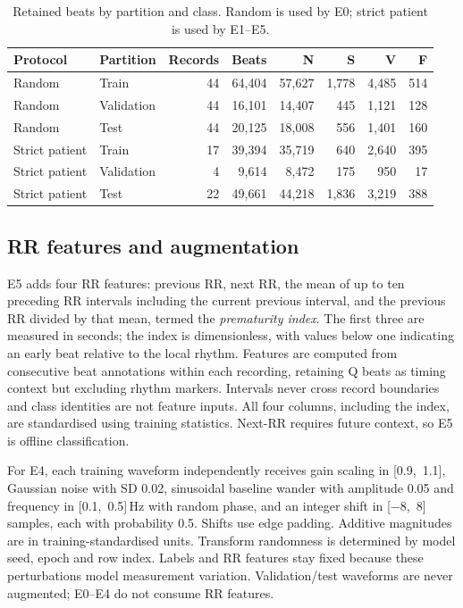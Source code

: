 \documentclass[10pt,a4paper]{article}
\begin{document}
\begin{table}[!htb]
\centering\small
\caption{Retained beats by partition and class. Random is used by E0; strict patient is used by E1--E5.}\label{tab:1}
\begin{tabular}{llrrrrrr}
\toprule
\textbf{Protocol} & \textbf{Partition} & \textbf{Records} & \textbf{Beats} & \textbf{N} & \textbf{S} & \textbf{V} & \textbf{F} \\
\midrule
Random & Train & 44 & 64,404 & 57,627 & 1,778 & 4,485 & 514 \\
Random & Validation & 44 & 16,101 & 14,407 & 445 & 1,121 & 128 \\
Random & Test & 44 & 20,125 & 18,008 & 556 & 1,401 & 160 \\
\midrule
Strict patient & Train & 17 & 39,394 & 35,719 & 640 & 2,640 & 395 \\
Strict patient & Validation & 4 & 9,614 & 8,472 & 175 & 950 & 17 \\
Strict patient & Test & 22 & 49,661 & 44,218 & 1,836 & 3,219 & 388 \\
\bottomrule
\end{tabular}
\end{table}

\subsection{RR features and augmentation}

E5 adds four RR features: previous RR, next RR, the mean of up to ten preceding RR intervals including the current previous interval, and the previous RR divided by that mean, termed the \emph{prematurity index}. The first three are measured in seconds; the index is dimensionless, with values below one indicating an early beat relative to the local rhythm. Features are computed from consecutive beat annotations within each recording, retaining Q beats as timing context but excluding rhythm markers. Intervals never cross record boundaries and class identities are not feature inputs. All four columns, including the index, are standardised using training statistics. Next-RR requires future context, so E5 is offline classification.

For E4, each training waveform independently receives gain scaling in [0.9,~1.1], Gaussian noise with SD 0.02, sinusoidal baseline wander with amplitude 0.05 and frequency in [0.1,~0.5]\,Hz with random phase, and an integer shift in [−8,~8] samples, each with probability 0.5. Shifts use edge padding. Additive magnitudes are in training-standardised units. Transform randomness is determined by model seed, epoch and row index. Labels and RR features stay fixed because these perturbations model measurement variation. Validation/test waveforms are never augmented; E0--E4 do not consume RR features.
\end{document}
